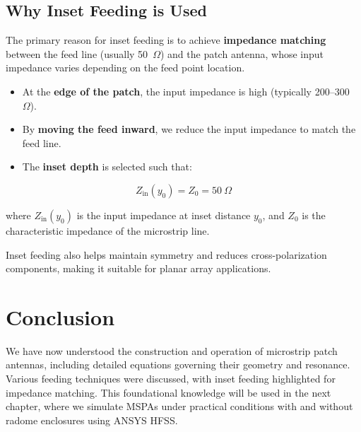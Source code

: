 \subsection*{Why Inset Feeding is Used}

The primary reason for inset feeding is to achieve \textbf{impedance matching} between the feed line (usually 50~$\Omega$) and the patch antenna, whose input impedance varies depending on the feed point location.

\begin{itemize}
    \item At the \textbf{edge of the patch}, the input impedance is high (typically 200–300~$\Omega$).
    \item By \textbf{moving the feed inward}, we reduce the input impedance to match the feed line.
    \item The \textbf{inset depth} is selected such that:
\end{itemize}

\[
Z_{\text{in}}(y_0) = Z_0 = 50~\Omega
\]

where $Z_{\text{in}}(y_0)$ is the input impedance at inset distance $y_0$, and $Z_0$ is the characteristic impedance of the microstrip line.

Inset feeding also helps maintain symmetry and reduces cross-polarization components, making it suitable for planar array applications.

\section*{Conclusion}

We have now understood the construction and operation of microstrip patch antennas, including detailed equations governing their geometry and resonance. Various feeding techniques were discussed, with inset feeding highlighted for impedance matching. This foundational knowledge will be used in the next chapter, where we simulate MSPAs under practical conditions with and without radome enclosures using ANSYS HFSS.
